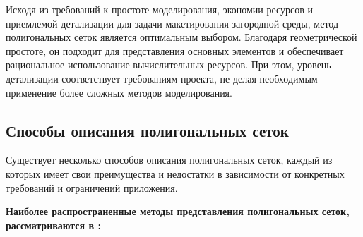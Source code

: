 Исходя из требований к простоте моделирования, экономии ресурсов и приемлемой детализации для задачи макетирования загородной среды, метод полигональных сеток является оптимальным выбором. Благодаря геометрической простоте, он подходит для представления основных элементов и обеспечивает рациональное использование вычислительных ресурсов. При этом, уровень детализации соответствует требованиям проекта, не делая необходимым применение более сложных методов моделирования.



\subsection{Способы описания полигональных сеток}

Существует несколько способов описания полигональных сеток, каждый из которых имеет свои преимущества и недостатки в зависимости от конкретных требований и ограничений приложения.

 \textbf{Наиболее распространенные методы представления полигональных сеток, рассматриваются в \cite{polygon_mesh}:}
 
